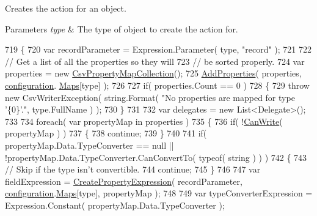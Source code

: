 Creates the action for an object. 


\begin{DoxyParams}{Parameters}
{\em type} & The type of object to create the action for.\\
\hline
\end{DoxyParams}

\begin{DoxyCode}
719         \{
720             var recordParameter = Expression.Parameter( type, \textcolor{stringliteral}{"record"} );
721 
722             \textcolor{comment}{// Get a list of all the properties so they will}
723             \textcolor{comment}{// be sorted properly.}
724             var properties = \textcolor{keyword}{new} \hyperlink{a00051}{CsvPropertyMapCollection}();
725             \hyperlink{a00061_ac913b615ee170ad2b84137c4d5c7eda2}{AddProperties}( properties, \hyperlink{a00061_a0711748c9a399cfbcbad93857304fc67}{configuration}.
      \hyperlink{a00043_a9119c99f5dafba985718f631f7bfa16a}{Maps}[type] );
726 
727             \textcolor{keywordflow}{if}( properties.Count == 0 )
728             \{
729                 \textcolor{keywordflow}{throw} \textcolor{keyword}{new} CsvWriterException( \textcolor{keywordtype}{string}.Format( \textcolor{stringliteral}{"No properties are mapped for type '\{0\}'."}, 
      type.FullName ) );
730             \}
731 
732             var delegates = \textcolor{keyword}{new} List<Delegate>();
733 
734             \textcolor{keywordflow}{foreach}( var propertyMap \textcolor{keywordflow}{in} properties )
735             \{
736                 \textcolor{keywordflow}{if}( !\hyperlink{a00061_a6085ddfd5e9c626d1d9f575ff21a0599}{CanWrite}( propertyMap ) )
737                 \{
738                     \textcolor{keywordflow}{continue};
739                 \}
740 
741                 \textcolor{keywordflow}{if}( propertyMap.Data.TypeConverter == null || !propertyMap.Data.TypeConverter.CanConvertTo(
       typeof( \textcolor{keywordtype}{string} ) ) )
742                 \{
743                     \textcolor{comment}{// Skip if the type isn't convertible.}
744                     \textcolor{keywordflow}{continue};
745                 \}
746 
747                 var fieldExpression = \hyperlink{a00061_aada073c07b3fd07dba434855ffb18b75}{CreatePropertyExpression}( recordParameter, 
      \hyperlink{a00061_a0711748c9a399cfbcbad93857304fc67}{configuration}.\hyperlink{a00043_a9119c99f5dafba985718f631f7bfa16a}{Maps}[type], propertyMap );
748 
749                 var typeConverterExpression = Expression.Constant( propertyMap.Data.TypeConverter );

\end{DoxyCode}
